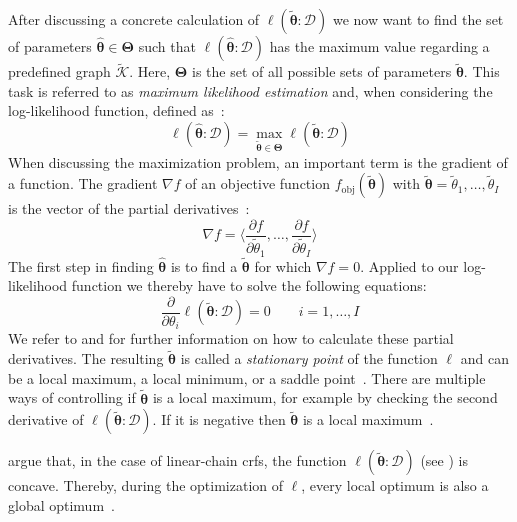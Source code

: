 After discussing a concrete calculation of $\ell(\bm{\tilde{\theta}}:\mathcal{D})$ we now want to find the set of parameters $\bm{\hat{\theta}}\in\bm{\Theta}$ such that $\ell(\bm{\hat{\theta}}:\mathcal{D})$ has the maximum value regarding a predefined graph $\mathcal{\tilde{K}}$.
Here, $\bm{\Theta}$ is the set of all possible sets of parameters $\bm{\tilde{\theta}}$.
This task is referred to as \textit{maximum likelihood estimation} and, when considering the log-likelihood function, defined as~\citep{koller2009probabilistic}:
\begin{equation}
  \label{equ:maximum-log-likelihood-estimation}
  \ell(\bm{\hat{\theta}}:\mathcal{D})=\max_{\bm{\tilde{\theta}}\in\bm{\Theta}}\ell(\bm{\tilde{\theta}}:\mathcal{D})
\end{equation}
When discussing the maximization problem, an important term is the \gls{gradient} of a \gls{function}.
The \gls{gradient} $\nabla f$ of an objective function $f_{\text{obj}}(\bm{\tilde{\theta}})$ with $\bm{\tilde{\theta}}=\tilde{\theta}_1,\dots,\tilde{\theta}_I$ is the vector of the partial derivatives~\citep{koller2009probabilistic}:
\begin{equation}
  \label{equ:gradient}
  \nabla f=\bigg\langle\frac{\partial f}{\partial\tilde{\theta}_1},\dots,\frac{\partial f}{\partial\tilde{\theta}_I}\bigg\rangle
\end{equation}
The first step in finding $\bm{\hat{\theta}}$ is to find a $\bm{\tilde{\theta}}$ for which $\nabla f=0$.
Applied to our log-likelihood function we thereby have to solve the following equations:
\begin{equation}
  \label{equ:log-likelihood-gradient}
  \frac{\partial}{\partial\theta_i}\ell(\bm{\tilde{\theta}}:\mathcal{D})=0\ \ \ \ \ \ \ \ \ i=1,\dots,I
\end{equation}
We refer to \citet{sutton2010introduction} and \citet{koller2009probabilistic} for further information on how to calculate these partial derivatives.
The resulting $\bm{\tilde{\theta}}$ is called a \textit{stationary point} of the function $\ell$ and can be a local maximum, a local minimum, or a saddle point~\citep{koller2009probabilistic}.
There are multiple ways of controlling if $\bm{\tilde{\theta}}$ is a local maximum, for example by checking the second derivative of $\ell(\bm{\tilde{\theta}}:\mathcal{D})$.
If it is negative then $\bm{\tilde{\theta}}$ is a local maximum~\citep{koller2009probabilistic}.

\citep{sutton2010introduction} argue that, in the case of \glspl{linear-chain crf}, the function $\ell(\bm{\tilde{\theta}}:\mathcal{D})$ (see ) is concave.
Thereby, during the optimization of $\ell$, every local optimum is also a global optimum~\citep{sutton2010introduction}.

